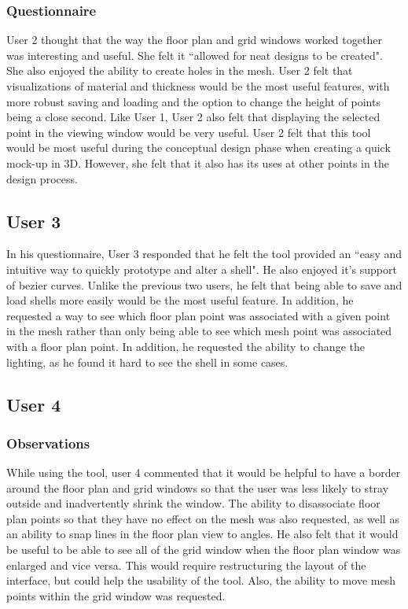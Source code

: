 \documentclass{thesis}
\begin{document}
\subsubsection{Questionnaire}
User 2 thought that the way the floor plan and grid windows worked together was interesting and useful.  She felt it ``allowed for neat
designs to be created".  She also enjoyed the ability to create holes in the mesh.  User 2 felt that visualizations of material and
thickness would be the most useful features, with more robust saving and loading and the option to change the height of points being
a close second.  Like User 1, User 2 also felt that displaying the selected point in the viewing window would be very useful.  User 2
felt that this tool would be most useful during the conceptual design phase when creating a quick mock-up in 3D.  However, she felt
that it also has its uses at other points in the design process.

\subsection{User 3}
In his questionnaire, User 3 responded that he felt the tool provided an ``easy and intuitive way to quickly prototype and alter a
shell".  He also enjoyed it's support of bezier curves.  Unlike the previous two users, he felt that being able to save and load
shells more easily would be the most useful feature.  In addition, he requested a way to see which floor plan point was associated with
a given point in the mesh rather than only being able to see which mesh point was associated with a floor plan point.  In addition, he
requested the ability to change the lighting, as he found it hard to see the shell in some cases.

\subsection{User 4}
\subsubsection{Observations}
While using the tool, user 4 commented that it would be helpful to have a border around the floor plan and grid windows so that the
user was less likely to stray outside and inadvertently shrink the window.  The ability to disassociate floor plan points so that they
have no effect on the mesh was also requested, as well as an ability to snap lines in the floor plan view to angles.  He also felt
that it would be useful to be able to see all of the grid window when the floor plan window was enlarged and vice versa.  This would
require restructuring the layout of the interface, but could help the usability of the tool.  Also, the ability to move mesh points
within the grid window was requested.
\end{document}
